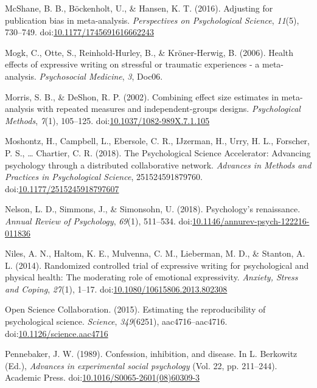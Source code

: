 \documentclass[man]{apa6}
\theoremstyle{definition}
\theoremstyle{definition}
\theoremstyle{definition}
\theoremstyle{remark}
\begin{document}
\hypertarget{ref-McShane2016}{}
McShane, B. B., Böckenholt, U., \& Hansen, K. T. (2016). Adjusting for
publication bias in meta-analysis. \emph{Perspectives on Psychological
Science}, \emph{11}(5), 730--749.
doi:\href{https://doi.org/10.1177/1745691616662243}{10.1177/1745691616662243}

\hypertarget{ref-Mogk2006}{}
Mogk, C., Otte, S., Reinhold-Hurley, B., \& Kröner-Herwig, B. (2006).
Health effects of expressive writing on stressful or traumatic
experiences - a meta-analysis. \emph{Psychosocial Medicine}, \emph{3},
Doc06.

\hypertarget{ref-Morris2002}{}
Morris, S. B., \& DeShon, R. P. (2002). Combining effect size estimates
in meta-analysis with repeated measures and independent-groups designs.
\emph{Psychological Methods}, \emph{7}(1), 105--125.
doi:\href{https://doi.org/10.1037/1082-989X.7.1.105}{10.1037/1082-989X.7.1.105}

\hypertarget{ref-Moshontz2018}{}
Moshontz, H., Campbell, L., Ebersole, C. R., IJzerman, H., Urry, H. L.,
Forscher, P. S., \ldots{} Chartier, C. R. (2018). The Psychological
Science Accelerator: Advancing psychology through a distributed
collaborative network. \emph{Advances in Methods and Practices in
Psychological Science}, 251524591879760.
doi:\href{https://doi.org/10.1177/2515245918797607}{10.1177/2515245918797607}

\hypertarget{ref-Nelson2018}{}
Nelson, L. D., Simmons, J., \& Simonsohn, U. (2018). Psychology's
renaissance. \emph{Annual Review of Psychology}, \emph{69}(1), 511--534.
doi:\href{https://doi.org/10.1146/annurev-psych-122216-011836}{10.1146/annurev-psych-122216-011836}

\hypertarget{ref-Niles2014}{}
Niles, A. N., Haltom, K. E., Mulvenna, C. M., Lieberman, M. D., \&
Stanton, A. L. (2014). Randomized controlled trial of expressive writing
for psychological and physical health: The moderating role of emotional
expressivity. \emph{Anxiety, Stress and Coping}, \emph{27}(1), 1--17.
doi:\href{https://doi.org/10.1080/10615806.2013.802308}{10.1080/10615806.2013.802308}

\hypertarget{ref-OpenScienceCollaboration2015}{}
Open Science Collaboration. (2015). Estimating the reproducibility of
psychological science. \emph{Science}, \emph{349}(6251),
aac4716--aac4716.
doi:\href{https://doi.org/10.1126/science.aac4716}{10.1126/science.aac4716}

\hypertarget{ref-Pennebaker1989}{}
Pennebaker, J. W. (1989). Confession, inhibition, and disease. In L.
Berkowitz (Ed.), \emph{Advances in experimental social psychology} (Vol.
22, pp. 211--244). Academic Press.
doi:\href{https://doi.org/10.1016/S0065-2601(08)60309-3}{10.1016/S0065-2601(08)60309-3}
\end{document}
